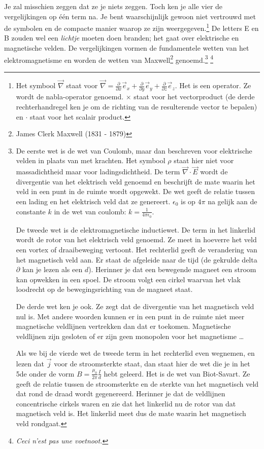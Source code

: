 \documentclass{ximera}
\begin{document}
	Je zal misschien zeggen dat ze je niets zeggen. Toch ken je alle vier de vergelijkingen op \'e\'en term na. Je bent waarschijnlijk gewoon niet vertrouwd met de symbolen en de compacte manier waarop ze zijn weergegeven.\footnote{Het symbool $\vec{\nabla}$ staat voor $\vec{\nabla}=\frac{\partial}{\partial x}\vec{e}_x+\frac{\partial}{\partial y}\vec{e}_y+\frac{\partial}{\partial z}\vec{e}_z$. Het is een operator. Ze wordt de nabla-operator genoemd. $\times$ staat voor het vectorproduct (de derde rechterhandregel ken je om de richting van de resulterende vector te bepalen) en $\cdot$ staat voor het scalair product.} De letters E en B zouden wel een \emph{lichtje} moeten doen branden; het gaat over elektrische en magnetische velden. De vergelijkingen vormen de fundamentele wetten van het elektromagnetisme en worden de wetten van Maxwell\footnote{James Clerk Maxwell (1831 - 1879)} genoemd.\footnote{De eerste wet is de wet van Coulomb, maar dan beschreven voor elektrische velden in plaats van met krachten. Het symbool $\rho$ staat hier niet voor massadichtheid maar voor ladingsdichtheid. De term $\vec{\nabla}\cdot\vec{E}$ wordt de divergentie van het elektrisch veld genoemd en beschrijft de mate waarin het veld in een punt in de ruimte wordt opgewekt. De wet geeft de relatie tussen een lading en het elektrisch veld dat ze genereert. $\epsilon_0$ is op $4\pi$ na gelijk aan de constante $k$ in de wet van coulomb: $k=\frac{1}{4\pi\epsilon_0}$.
	
	De tweede wet is de elektromagnetische inductiewet. De term in het linkerlid wordt de rotor van het elektrisch veld genoemd. Ze meet in hoeverre het veld een vortex of draaibeweging vertoont. Het rechterlid geeft de verandering van het magnetisch veld aan. Er staat de afgeleide naar de tijd (de gekrulde delta $\partial$ kan je lezen als een $d$). Herinner je dat een bewegende magneet een stroom kan opwekken in een spoel. De stroom volgt een cirkel waarvan het vlak loodrecht op de bewegingsrichting van de magneet staat. 
	
	De derde wet ken je ook. Ze zegt dat de divergentie van het magnetisch veld nul is. Met andere woorden kunnen er in een punt in de ruimte niet meer magnetische veldlijnen vertrekken dan dat er toekomen. Magnetische veldlijnen zijn gesloten of er zijn geen monopolen voor het magnetisme \ldots
	
	Als we bij de vierde wet de tweede term in het rechterlid even wegnemen, en lezen dat $\vec{j}$ voor de stroomsterkte staat, dan staat hier de wet die je in het 5de onder de vorm $B=\frac{\mu_0}{2\pi}\frac{I}{d}$ hebt geleerd. Het is de wet van Biot-Savart. Ze geeft de relatie tussen de stroomsterkte en de sterkte van het magnetisch veld dat rond de draad wordt gegenereerd. Herinner je dat de veldlijnen concentrische cirkels waren en zie dat het linkerlid nu de rotor van dat magnetisch veld is. Het linkerlid meet dus de mate waarin het magnetisch veld rondgaat.} \footnote{\textit{Ceci n'est pas une voetnoot.}\footnotemark}
	
\end{document}

